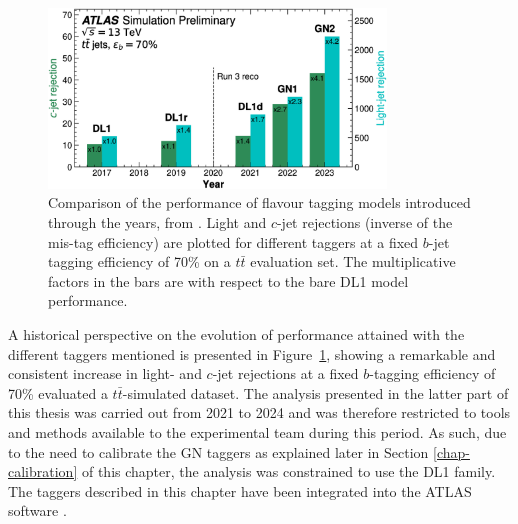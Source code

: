 \begin{figure}[h!]
  \center
  \includegraphics[width=0.8\textwidth]{Images/FTAG/storyFtag.png}
  \caption{Comparison of the performance of flavour tagging models introduced through the years, from \cite{ATL-PLOT-FTAG-2023-01}. Light and $c$-jet rejections (inverse of the mis-tag efficiency) are plotted for different taggers at a fixed $b$-jet tagging efficiency of 70\% on a $t\bar{t}$ evaluation set. The multiplicative factors in the bars are with respect to the bare DL1 model performance.} 
  \label{fig:storyFtag}
\end{figure}

A historical perspective on the evolution of performance attained with the different taggers mentioned is presented in Figure~\ref{fig:storyFtag}, showing a remarkable and consistent increase in light- and $c$-jet rejections at a fixed $b$-tagging efficiency of 70\% evaluated a $t\bar{t}$-simulated dataset. The analysis presented in the latter part of this thesis was carried out from 2021 to 2024 and was therefore restricted to tools and methods available to the experimental team during this period. As such, due to the need to calibrate the GN taggers as explained later in Section \ref{chap-calibration} of this chapter, the analysis was constrained to use the DL1 family. The taggers described in this chapter have been integrated into the ATLAS software \cite{ATL-SOFT-PUB-2021-001}. 

